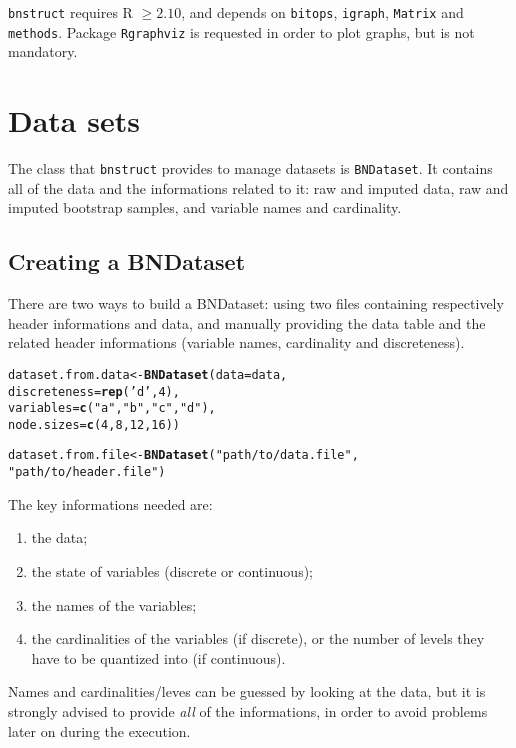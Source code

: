 \documentclass{article}\usepackage[]{graphicx}\usepackage[]{color}
\makeatletter
\newcommand{\hlnum}[1]{\textcolor[rgb]{0.686,0.059,0.569}{#1}}%
\newcommand{\hlstr}[1]{\textcolor[rgb]{0.192,0.494,0.8}{#1}}%
\newcommand{\hlstd}[1]{\textcolor[rgb]{0.345,0.345,0.345}{#1}}%
\newcommand{\hlkwb}[1]{\textcolor[rgb]{0.69,0.353,0.396}{#1}}%
\newcommand{\hlkwc}[1]{\textcolor[rgb]{0.333,0.667,0.333}{#1}}%
\newcommand{\hlkwd}[1]{\textcolor[rgb]{0.737,0.353,0.396}{\textbf{#1}}}%
\newenvironment{kframe}{%
 \def\at@end@of@kframe{}%
 \ifinner\ifhmode%
  \def\at@end@of@kframe{\end{minipage}}%
  \begin{minipage}{\columnwidth}%
 \fi\fi%
 \def\FrameCommand##1{\hskip\@totalleftmargin \hskip-\fboxsep
 \colorbox{shadecolor}{##1}\hskip-\fboxsep
     \hskip-\linewidth \hskip-\@totalleftmargin \hskip\columnwidth}%
 \MakeFramed {\advance\hsize-\width
   \@totalleftmargin\z@ \linewidth\hsize
   \@setminipage}}%
 {\par\unskip\endMakeFramed%
 \at@end@of@kframe}
\newenvironment{knitrout}{}{} %
\newcommand{\Robject}[1]{{\texttt{#1}}}
\newcommand{\Rpackage}[1]{{\texttt{#1}}}
\makeatother
\begin{document}
\Rpackage{bnstruct} requires R $\geq 2.10$,
and depends on \Rpackage{bitops}, \Rpackage{igraph}, \Rpackage{Matrix} and \Rpackage{methods}.
Package \Rpackage{Rgraphviz} is requested in order to plot graphs, but is not mandatory.


\section{Data sets}
The class that \Rpackage{bnstruct} provides to manage datasets is \Robject{BNDataset}.
It contains all of the data and the informations related to it: raw and imputed data, raw and imputed
bootstrap samples, and variable names and cardinality.

\subsection{Creating a BNDataset}
There are two ways to build a BNDataset: using two files containing respectively header informations
and data, and manually providing the data table and the related header informations
(variable names, cardinality and discreteness).

\begin{knitrout}
\color{fgcolor}\begin{kframe}
\begin{alltt}
\hlstd{dataset.from.data} \hlkwb{<-} \hlkwd{BNDataset}\hlstd{(}\hlkwc{data} \hlstd{= data,}
                               \hlkwc{discreteness} \hlstd{=} \hlkwd{rep}\hlstd{(}\hlstr{'d'}\hlstd{,}\hlnum{4}\hlstd{),}
                               \hlkwc{variables} \hlstd{=} \hlkwd{c}\hlstd{(}\hlstr{"a"}\hlstd{,} \hlstr{"b"}\hlstd{,} \hlstr{"c"}\hlstd{,} \hlstr{"d"}\hlstd{),}
                               \hlkwc{node.sizes} \hlstd{=} \hlkwd{c}\hlstd{(}\hlnum{4}\hlstd{,}\hlnum{8}\hlstd{,}\hlnum{12}\hlstd{,}\hlnum{16}\hlstd{))}

\hlstd{dataset.from.file} \hlkwb{<-} \hlkwd{BNDataset}\hlstd{(}\hlstr{"path/to/data.file"}\hlstd{,}
                               \hlstr{"path/to/header.file"}\hlstd{)}
\end{alltt}
\end{kframe}
\end{knitrout}

The key informations needed are:
\begin{enumerate}
\item the data;
\item the state of variables (discrete or continuous);
\item the names of the variables;
\item the cardinalities of the variables (if discrete), or the number of levels they have to be quantized into
(if continuous). 
\end{enumerate}
Names and cardinalities/leves can be guessed by looking at the data, but it is strongly advised to provide
\textit{all} of the informations, in order to avoid problems later on during the execution.
\end{document}
